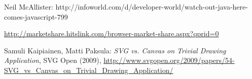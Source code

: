 \documentclass[12pt,a4paper]{article}%
\begin{document}
\begin{thebibliography}{99}
     Neil McAllister: http://infoworld.com/d/developer-world/watch-out-java-here-comes-javascript-799
    
     \href{http://marketshare.hitslink.com/browser-market-share.aspx?qprid=0}{http://marketshare.hitslink.com/browser-market-share.aspx?qprid=0}
    
     Samuli Kaipiainen, Matti Paksula: 
            \emph{SVG vs. Canvas on Trivial Drawing Application}, SVG Open (2009),  
              \href{http://www.svgopen.org/2009/papers/54-SVG_vs_Canvas_on_Trivial_Drawing_Application/}{http://www.svgopen.org/2009/papers/54-SVG\_vs\_Canvas\_on\_Trivial\_Drawing\_Application/}
\end{thebibliography}
\end{document}
